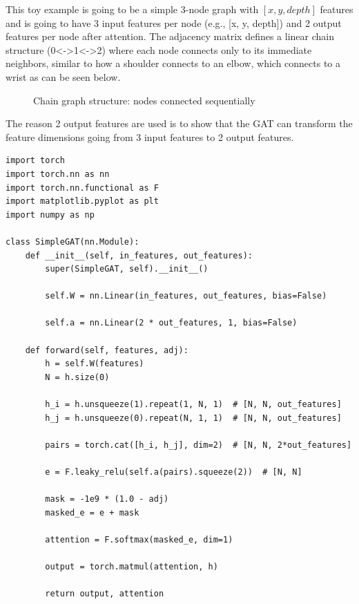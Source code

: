 This toy example is going to be a simple 3-node graph with $[x,y,depth]$
features and is going to have 3 input features per node (e.g., [x, y, depth])
and 2 output features per node after attention. The adjacency matrix defines a
linear chain structure (0<->1<->2) where each node connects only to its immediate
neighbors, similar to how a shoulder connects to an elbow, which connects to a
wrist as can be seen below.

\begin{figure}[h]
\centering
{}
\caption{Chain graph structure: nodes connected sequentially}
\end{figure}

The reason 2 output features are used is to show that the GAT can transform the
feature dimensions going from 3 input features to 2 output features.
 
\begin{lstlisting}[style=pythonstyle,title={GAT toy example},label={code:gat_toy_example}]
import torch
import torch.nn as nn
import torch.nn.functional as F
import matplotlib.pyplot as plt
import numpy as np

class SimpleGAT(nn.Module):
    def __init__(self, in_features, out_features):
        super(SimpleGAT, self).__init__()
        
        self.W = nn.Linear(in_features, out_features, bias=False)
        
        self.a = nn.Linear(2 * out_features, 1, bias=False)
        
    def forward(self, features, adj):
        h = self.W(features)
        N = h.size(0)
        
        h_i = h.unsqueeze(1).repeat(1, N, 1)  # [N, N, out_features]
        h_j = h.unsqueeze(0).repeat(N, 1, 1)  # [N, N, out_features]
        
        pairs = torch.cat([h_i, h_j], dim=2)  # [N, N, 2*out_features]
        
        e = F.leaky_relu(self.a(pairs).squeeze(2))  # [N, N]
        
        mask = -1e9 * (1.0 - adj)
        masked_e = e + mask
        
        attention = F.softmax(masked_e, dim=1)
        
        output = torch.matmul(attention, h)
        
        return output, attention
\end{lstlisting}

